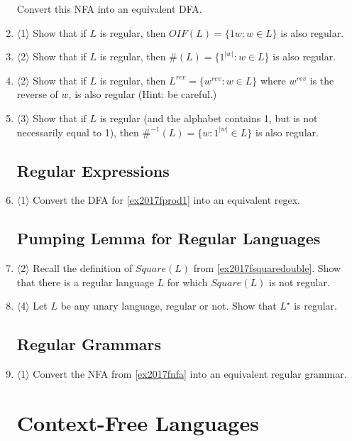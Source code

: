\documentclass[a4paper,american,12pt]{book}
\newcommand{\Level}[1]{{\color{blue} $\langle$#1$\rangle$}}
\begin{document}
\begin{enumerate}
Convert this NFA into an equivalent DFA.

\item \Level{1} Show that if $L$ is regular, then $OIF(L) = \{1w : w \in L \}$ is also regular.

\item \Level{2} Show that if $L$ is regular, then $\#(L) = \{1^{|w|} : w \in L\}$ is also regular.

\item \Level{2} Show that if $L$ is regular, then $L^{rev} = \{w^{rev} : w \in L\}$ where $w^{rev}$ is the reverse of $w$, is also regular (Hint: be careful.)

\item \Level{3} Show that if $L$ is regular (and the alphabet contains 1, but is not necessarily equal to 1), then $\#^{-1}(L) = \{w : 1^{|w|} \in L\}$ is also regular.



\subsection{Regular Expressions}

\item \Level{1} Convert the DFA for \cref{ex2017fprod1} into an equivalent regex.

\subsection{Pumping Lemma for Regular Languages}

\item \Level{2} Recall the definition of $Square(L)$ from \cref{ex2017fsquaredouble}. 
Show that there is a regular language $L$ for which $Square(L)$ is not regular.

\item \Level{4} Let $L$ be any unary language, regular or not. Show that $L^\star$ is regular.

\subsection{Regular Grammars}

\item \Level{1} Convert the NFA from \cref{ex2017fnfa} into an equivalent regular grammar.

\section{Context-Free Languages}


\end{enumerate}
\end{document}
